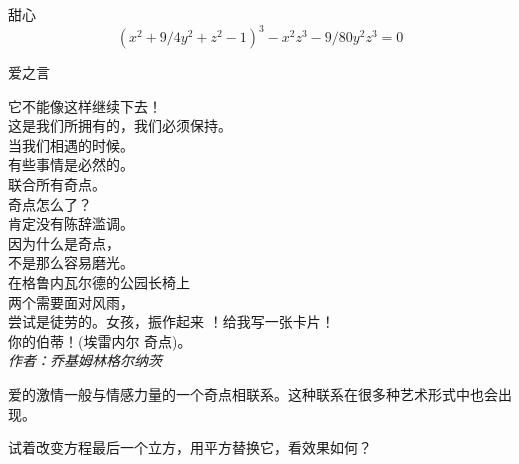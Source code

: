 ﻿\begin{surferPage}{甜心}
\[(x^2+ 9/4y^2	+ z^2- 1)^3- x^2z^3	- 9/80y^2z^3	= 0\]

\singlespacing
 爱之言
\singlespacing

它不能像这样继续下去！\\
这是我们所拥有的，我们必须保持。\\
当我们相遇的时候。\\
有些事情是必然的。\\
联合所有奇点。\\
奇点怎么了？\\
肯定没有陈辞滥调。\\
因为什么是奇点，\\
不是那么容易磨光。\\
在格鲁内瓦尔德的公园长椅上\\
两个需要面对风雨，\\
尝试是徒劳的。女孩，振作起来 ！给我写一张卡片！\\
你的伯蒂！(埃雷内尔 奇点)。\\
\textit{作者：乔基姆林格尔纳茨}

\singlespacing 
爱的激情一般与情感力量的一个奇点相联系。这种联系在很多种艺术形式中也会出现。

\singlespacing 
试着改变方程最后一个立方，用平方替换它，看效果如何？
\end{surferPage}
